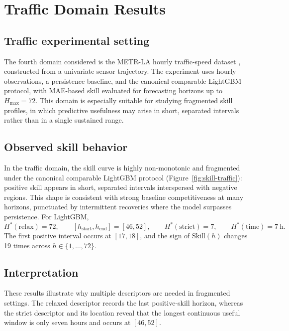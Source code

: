 \documentclass[pdflatex]{sn-jnl}
\begin{document}
\section{Traffic Domain Results}

\subsection{Traffic experimental setting}

The fourth domain considered is the METR-LA hourly traffic-speed dataset \citep{li2018dcrnn}, constructed from a univariate sensor trajectory. The experiment uses hourly observations, a persistence baseline, and the canonical comparable LightGBM protocol, with MAE-based skill evaluated for forecasting horizons up to $H_{\max}=72$. This domain is especially suitable for studying fragmented skill profiles, in which predictive usefulness may arise in short, separated intervals rather than in a single sustained range.

\subsection{Observed skill behavior}
In the traffic domain, the skill curve is highly non-monotonic and fragmented under the canonical comparable LightGBM protocol (Figure~\ref{fig:skill-traffic}): positive skill appears in short, separated intervals interspersed with negative regions. This shape is consistent with strong baseline competitiveness at many horizons, punctuated by intermittent recoveries where the model surpasses persistence.
For LightGBM,
\begin{equation}
H^*(\mathrm{relax}) = 72, \qquad [h_{\mathrm{start}}, h_{\mathrm{end}}] = [46,52], \qquad H^*(\mathrm{strict}) = 7, \qquad H^*(\mathrm{time}) = 7\ \mathrm{h}.
\end{equation}
The first positive interval occurs at $[17,18]$, and the sign of $\mathrm{Skill}(h)$ changes 19 times across $h\in\{1,\dots,72\}$.

\subsection{Interpretation}
These results illustrate why multiple descriptors are needed in fragmented
settings. The relaxed descriptor records the last positive-skill horizon,
whereas the strict descriptor and its location reveal that the longest
continuous useful window is only seven hours and occurs at $[46,52]$.
\end{document}
